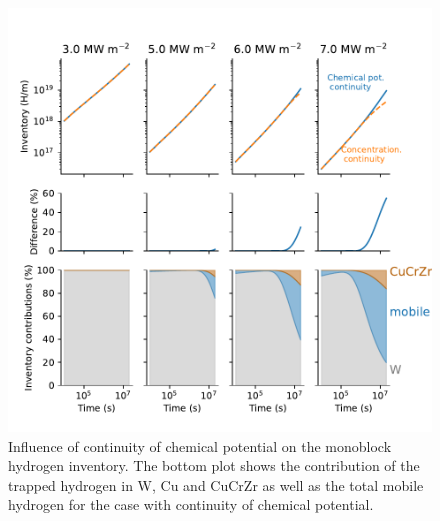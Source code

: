 \begin{figure}
    \centering
    \includegraphics[width=\linewidth]{Figures/Chapter3/monoblocks/interface_condition/difference_w_wo_chemical_pot.pdf}
    \caption{Influence of continuity of chemical potential on the monoblock hydrogen inventory. The bottom plot shows the contribution of the trapped hydrogen in W, Cu and CuCrZr as well as the total mobile hydrogen for the case with continuity of chemical potential.}
\end{figure}


